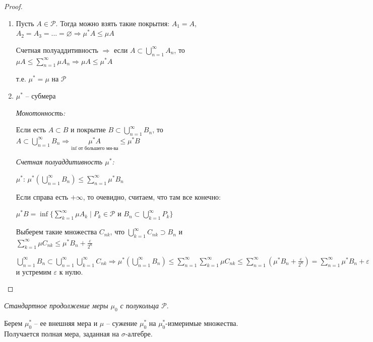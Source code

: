 \begin{proof}~
    \begin{enumerate}
        \item Пусть $A\in\mathcal{P}$. Тогда можно взять такие покрытия: $A_1=A$, $A_2=A_3=...=\varnothing\Rightarrow \mu^* A\leq \mu A$
        
        Счетная полуаддитивность $\Rightarrow$ если $A\subset \bigcup\limits_{n=1}^\infty A_n$, 
        то $\mu A \leq \sum \limits_{n=1}^\infty \mu A_n\Rightarrow \mu A \leq \mu^* A$

        т.е. $\mu^* =\mu$ на $\mathcal{P}$

        \item $\mu^*$ – субмера 
        
        \textit{Монотонность:} 
        
        Если есть $A\subset B$ и покрытие $B\subset \bigcup\limits_{n=1}^\infty B_n$, то $A\subset \bigcup\limits_{n=1}^\infty B_n\Rightarrow
        \underset{\inf \text{ от большего мн-ва}}{\mu^* A} \leq \mu^*B$ 
        
        \textit{Счетная полуаддитивность $\mu^*$:} 
        
        $\mu^*$: $\mu^*(\bigcup\limits_{n=1}^\infty B_n)\leq \sum\limits_{n=1}^\infty \mu^* B_n$ 
        
        Если справа есть $+\infty$, то очевидно, считаем, что там все конечно:

        $\mu^* B =\inf \{\sum\limits_{k=1}^\infty \mu A_k\mid P_k\in \mathcal{P}\text{ и } B_n\subset \bigcup\limits_{k=1}^\infty P_k\}$

        Выберем такие множества $C_{nk}$, что $\bigcup\limits_{k=1}^\infty C_{nk}\supset B_n$ и $\sum\limits_{k=1}^\infty \mu C_{nk}\leq \mu^* B_n +\frac{\varepsilon}{2^n}$

        $\bigcup\limits_{n=1}^\infty B_n\subset \bigcup\limits_{n=1}^\infty\bigcup\limits_{k=1}^\infty C_{nk}\Rightarrow 
        \mu^* (\bigcup\limits_{n=1}^\infty B_n)\leq \sum\limits_{n=1}^\infty\sum\limits_{k=1}^\infty \mu C_{nk}\leq
        \sum\limits_{n=1}^\infty (\mu^* B_n + \frac{\varepsilon}{2^n})=\sum\limits_{n=1}^\infty \mu^* B_n + \varepsilon$ и устремим $\varepsilon$ к нулю.
    \end{enumerate}
\end{proof}

\begin{definition}
    \textit{Стандартное продолжение меры $\mu_0$ с полукольца $\mathcal{P}$}.

    Берем $\mu_0^*$ – ее внешняя мера и $\mu$ – сужение $\mu_0^*$ на $\mu_0^*$-измеримые множества. 
    Получается полная мера, заданная на $\sigma$-алгебре.
\end{definition}

